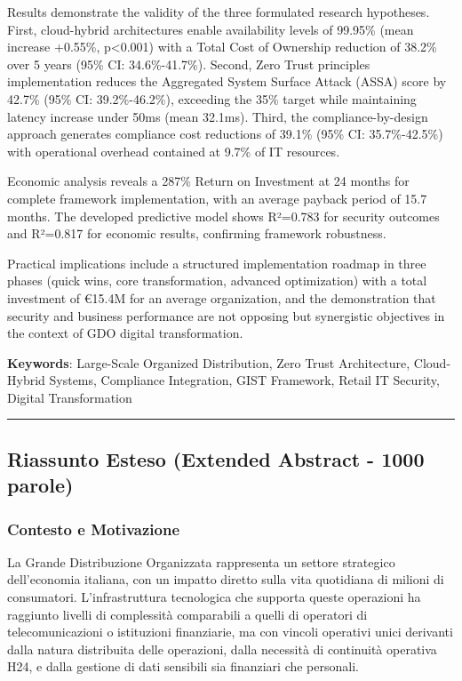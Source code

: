 \documentclass{report}
\begin{document}
Results demonstrate the validity of the three formulated research
hypotheses. First, cloud-hybrid architectures enable availability levels
of 99.95\% (mean increase +0.55\%, p\textless0.001) with a Total Cost of
Ownership reduction of 38.2\% over 5 years (95\% CI: 34.6\%-41.7\%).
Second, Zero Trust principles implementation reduces the Aggregated
System Surface Attack (ASSA) score by 42.7\% (95\% CI: 39.2\%-46.2\%),
exceeding the 35\% target while maintaining latency increase under 50ms
(mean 32.1ms). Third, the compliance-by-design approach generates
compliance cost reductions of 39.1\% (95\% CI: 35.7\%-42.5\%) with
operational overhead contained at 9.7\% of IT resources.

Economic analysis reveals a 287\% Return on Investment at 24 months for
complete framework implementation, with an average payback period of
15.7 months. The developed predictive model shows R²=0.783 for security
outcomes and R²=0.817 for economic results, confirming framework
robustness.

Practical implications include a structured implementation roadmap in
three phases (quick wins, core transformation, advanced optimization)
with a total investment of €15.4M for an average organization, and the
demonstration that security and business performance are not opposing
but synergistic objectives in the context of GDO digital transformation.

\textbf{Keywords}: Large-Scale Organized Distribution, Zero Trust
Architecture, Cloud-Hybrid Systems, Compliance Integration, GIST
Framework, Retail IT Security, Digital Transformation

\begin{center}\rule{0.5\linewidth}{0.5pt}\end{center}

\subsection{Riassunto Esteso (Extended Abstract - 1000
parole)}\label{riassunto-esteso-extended-abstract---1000-parole}

\subsubsection{Contesto e Motivazione}\label{contesto-e-motivazione}

La Grande Distribuzione Organizzata rappresenta un settore strategico
dell'economia italiana, con un impatto diretto sulla vita quotidiana di
milioni di consumatori. L'infrastruttura tecnologica che supporta queste
operazioni ha raggiunto livelli di complessità comparabili a quelli di
operatori di telecomunicazioni o istituzioni finanziarie, ma con vincoli
operativi unici derivanti dalla natura distribuita delle operazioni,
dalla necessità di continuità operativa H24, e dalla gestione di dati
sensibili sia finanziari che personali.
\end{document}
